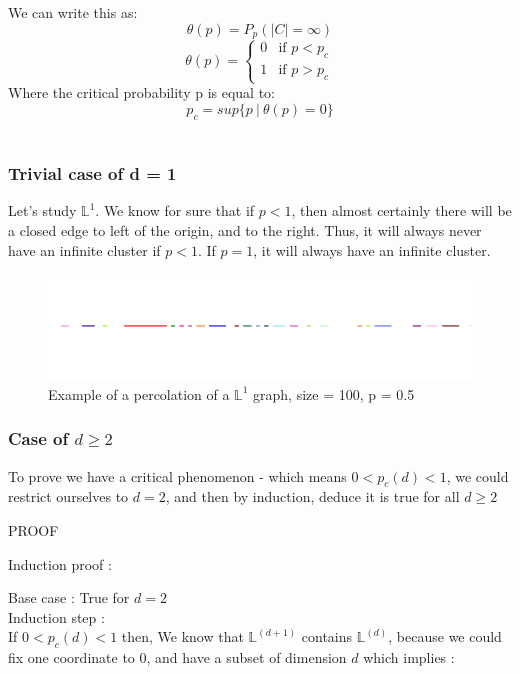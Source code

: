 \documentclass{article}
\begin{document}
We can write this as: \\
$$\theta(p) = P_p(|C|=\infty)$$
$$
\theta(p) = \left\{
    \begin{array}{ll}
        0 & \mbox{if $p < p_c$}\\
        1 & \mbox{if $p > p_c$}
    \end{array}
\right.
$$
Where the critical probability p is equal to:
$$p_c = sup\{p \ | \ \theta(p)=0\}$$ \\

\subsubsection{Trivial case of d = 1}

Let's study $\mathbb{L}^1$. We know for sure that if $p < 1$, then almost certainly there will be a closed edge to left of the origin, and to the right. Thus, it will always never have an infinite cluster if $p < 1$. If $p = 1$, it will always have an infinite cluster. \\

\begin{figure}[ht]
\includegraphics[scale=0.5]{percolationL1}
\centering

\caption{Example of a percolation of a $\mathbb{L}^1$ graph, size = 100, p = 0.5}
\end{figure}

\subsubsection{Case of $d \geq 2$}

To prove we have a critical phenomenon - which means $0 < p_c(d) < 1$, we could restrict ourselves to $d = 2$, and then by induction, deduce it is true for all $d \geq 2$

PROOF

Induction proof :

Base case : True for $d = 2$\\
Induction step :\\

If $0 < p_c(d) < 1$ then,
We know that $\mathbb{L}^(d+1)$ contains $\mathbb{L}^(d)$, because we could fix one coordinate to $0$, and have a subset of dimension $d$ which implies :
\end{document}
